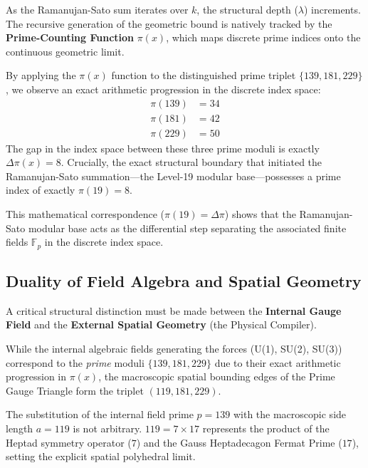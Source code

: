 As the Ramanujan-Sato sum iterates over $k$, the structural depth ($\lambda$) increments. The recursive generation of the geometric bound is natively tracked by the \textbf{Prime-Counting Function} $\pi(x)$, which maps discrete prime indices onto the continuous geometric limit.

By applying the $\pi(x)$ function to the distinguished prime triplet $\{139, 181, 229\}$, we observe an exact arithmetic progression in the discrete index space:
\begin{align*}
\pi(139) &= 34 \\
\pi(181) &= 42 \\
\pi(229) &= 50
\end{align*}
The gap in the index space between these three prime moduli is exactly $\Delta \pi(x) = 8$. Crucially, the exact structural boundary that initiated the Ramanujan-Sato summation---the Level-19 modular base---possesses a prime index of exactly $\pi(19) = 8$.

This mathematical correspondence ($\pi(19) = \Delta \pi$) shows that the Ramanujan-Sato modular base acts as the differential step separating the associated finite fields $\mathbb{F}_p$ in the discrete index space.

\subsection{Duality of Field Algebra and Spatial Geometry}
A critical structural distinction must be made between the \textbf{Internal Gauge Field} and the \textbf{External Spatial Geometry} (the Physical Compiler).

While the internal algebraic fields generating the forces (U(1), SU(2), SU(3)) correspond to the \emph{prime} moduli $\{139, 181, 229\}$ due to their exact arithmetic progression in $\pi(x)$, the macroscopic spatial bounding edges of the Prime Gauge Triangle form the triplet $(119, 181, 229)$. 

The substitution of the internal field prime $p=139$ with the macroscopic side length $a=119$ is not arbitrary. $119 = 7 \times 17$ represents the product of the Heptad symmetry operator ($7$) and the Gauss Heptadecagon Fermat Prime ($17$), setting the explicit spatial polyhedral limit.

